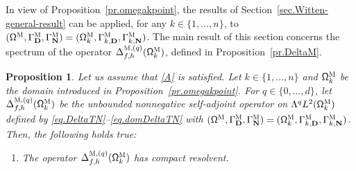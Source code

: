 \documentclass[10pt]{amsart}
\newenvironment{enumeratei}
{\bgroup\def\theenumi{\roman{enumi}}\def\theenumii{\arabic{enumii}}\begin{enumerate}}
{\end{enumerate}\egroup}
\newcommand{\mbf}[1]{\mathbf{#1}}
\theoremstyle{plain}
\newtheorem{proposition}{Proposition}
\theoremstyle{definition}
\begin{document}
\label{sec.specM}

In view of Proposition~\ref{pr.omegakpoint}, the results of Section~\ref{sec.Witten-general-result} can be applied, for any
$k\in\{1,\ldots,n\}$, to $(\mathsf \Omega^{\textsc{M}}, \Gamma^{\textsc{M}}_{\mbf D}, \Gamma^{\textsc{M}}_{\mbf N}) = (\mathsf \Omega_k^{\textsc{M}}, \Gamma_{k,\mbf D}^{\textsc{M}}, \Gamma_{k,\mbf N}^{\textsc{M}})$.
The main result of this section concerns the spectrum of the operator
$\Delta_{f,h}^{\textsc{M}, (q)} (\mathsf \Omega_k^{\textsc{M}})$,
defined in Proposition~\ref{pr.DeltaM}.

\begin{proposition}
\label{pr.DeltaTN}
Let us assume that \ref{A} is satisfied. Let
$k\in\{1,\ldots,n\}$ and $ \mathsf \Omega_k^{\textsc{M}} $ be the
domain introduced in Proposition~\ref{pr.omegakpoint}. For $q\in\{0,\ldots,d\}$, let $\Delta_{f,h}^{\textsc{M}, (q)}(\mathsf \Omega_k^{\textsc{M}})$ be the unbounded
nonnegative self-adjoint operator on
$ \Lambda^qL^{2} (\mathsf \Omega_k^{\textsc{M}})$ defined by \eqref{eq.DeltaTN}--\eqref{eq.domDeltaTN} with $(\mathsf \Omega^{\textsc{M}}, \Gamma^{\textsc{M}}_{\mbf D}, \Gamma^{\textsc{M}}_{\mbf N}) = (\mathsf \Omega_k^{\textsc{M}}, \Gamma_{k,\mbf D}^{\textsc{M}}, \Gamma_{k,\mbf N}^{\textsc{M}})$.
Then, the following holds true:
\begin{enumeratei}
\item\label{pr.DeltaTNi}
The operator $\Delta_{f,h}^{\textsc{M},(q)} (\mathsf \Omega_k^{\textsc{M}})$ has compact resolvent.


\end{enumeratei}
\end{proposition}
\end{document}
